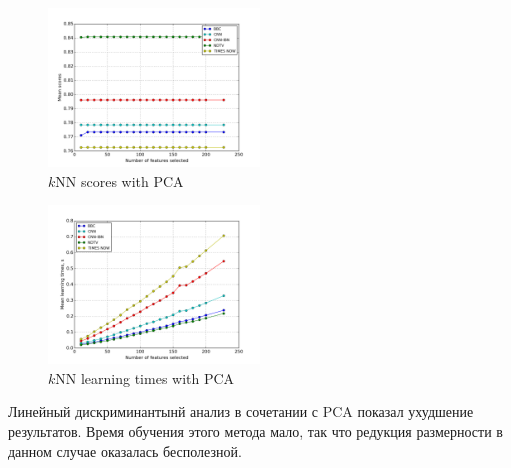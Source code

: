 \begin{figure}[h!]
    \centering
    \includegraphics[width=0.5\textwidth]{images/PCA-kNN.png}
    \caption{\(k\)NN scores with PCA}
    \label{fig:knn_pca_scores}
\end{figure} 
\begin{figure}[h!]
    \centering
    \includegraphics[width=0.5\textwidth]{images/PCA-kNNTime.png}
    \caption{\(k\)NN learning times with PCA}
    \label{fig:knn_pca_times}
\end{figure} 
\par
Линейный дискриминантынй анализ в сочетании с PCA показал ухудшение результатов. Время обучения этого метода мало, так что редукция размерности в данном случае оказалась бесполезной.

